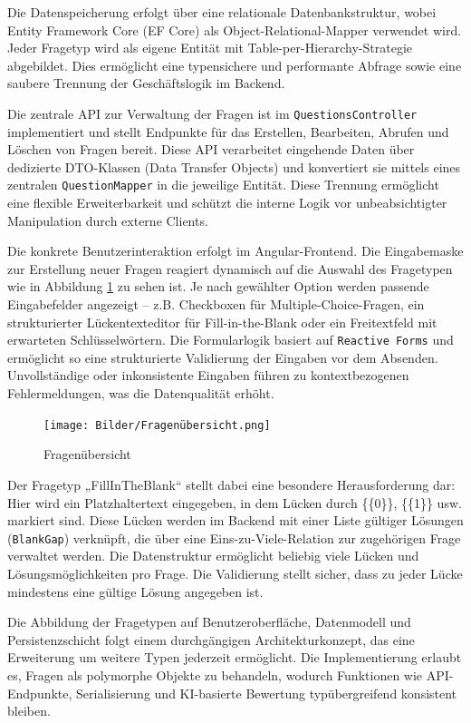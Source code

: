 \documentclass[a4paper,12pt]{article}
\begin{document}
Die Datenspeicherung erfolgt über eine relationale Datenbankstruktur, wobei Entity Framework Core (EF Core) als Object-Relational-Mapper verwendet wird. Jeder Fragetyp wird als eigene Entität mit Table-per-Hierarchy-Strategie abgebildet. Dies ermöglicht eine typensichere und performante Abfrage sowie eine saubere Trennung der Geschäftslogik im Backend.

Die zentrale API zur Verwaltung der Fragen ist im \texttt{QuestionsController} implementiert und stellt Endpunkte für das Erstellen, Bearbeiten, Abrufen und Löschen von Fragen bereit. Diese API verarbeitet eingehende Daten über dedizierte DTO-Klassen (Data Transfer Objects) und konvertiert sie mittels eines zentralen \texttt{QuestionMapper} in die jeweilige Entität. Diese Trennung ermöglicht eine flexible Erweiterbarkeit und schützt die interne Logik vor unbeabsichtigter Manipulation durch externe Clients.

Die konkrete Benutzerinteraktion erfolgt im Angular-Frontend. Die Eingabemaske zur Erstellung neuer Fragen reagiert dynamisch auf die Auswahl des Fragetypen wie in Abbildung \ref{fig:Fragenübersicht} zu sehen ist. Je nach gewählter Option werden passende Eingabefelder angezeigt – z.B. Checkboxen für Multiple-Choice-Fragen, ein strukturierter Lückentexteditor für Fill-in-the-Blank oder ein Freitextfeld mit erwarteten Schlüsselwörtern. Die Formularlogik basiert auf \texttt{Reactive Forms} und ermöglicht so eine strukturierte Validierung der Eingaben vor dem Absenden. Unvollständige oder inkonsistente Eingaben führen zu kontextbezogenen Fehlermeldungen, was die Datenqualität erhöht.

\begin{figure}[H]
    \centering
    \texttt{[image: Bilder/Fragenübersicht.png]}
    \caption{Fragenübersicht}
    \label{fig:Fragenübersicht}
\end{figure}

Der Fragetyp „FillInTheBlank“ stellt dabei eine besondere Herausforderung dar: Hier wird ein Platzhaltertext eingegeben, in dem Lücken durch \{\{0\}\}, \{\{1\}\} usw. markiert sind. Diese Lücken werden im Backend mit einer Liste gültiger Lösungen (\texttt{BlankGap}) verknüpft, die über eine Eins-zu-Viele-Relation zur zugehörigen Frage verwaltet werden. Die Datenstruktur ermöglicht beliebig viele Lücken und Lösungsmöglichkeiten pro Frage. Die Validierung stellt sicher, dass zu jeder Lücke mindestens eine gültige Lösung angegeben ist.

Die Abbildung der Fragetypen auf Benutzeroberfläche, Datenmodell und Persistenzschicht folgt einem durchgängigen Architekturkonzept, das eine Erweiterung um weitere Typen jederzeit ermöglicht. Die Implementierung erlaubt es, Fragen als polymorphe Objekte zu behandeln, wodurch Funktionen wie API-Endpunkte, Serialisierung und KI-basierte Bewertung typübergreifend konsistent bleiben.
\end{document}
